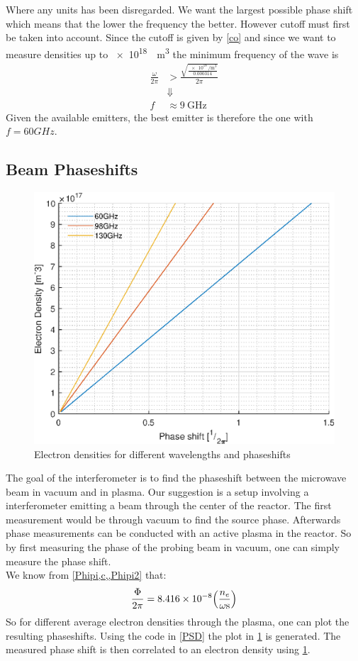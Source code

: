 Where any units has been disregarded. We want the largest possible phase shift which means that the lower the frequency the better. However cutoff must first be taken into account.
Since the cutoff is given by \cref{co} and since we want to measure densities up to \SI{e18}{\per\meter\cubed} the minimum frequency of the wave is
\begin{align}
	\frac{\omega}{2\pi} & > \frac{\sqrt{\frac{\SI{e18}{\per\meter\cubed}}{0.000314}}}{2\pi} \\
	                    & \Downarrow\nonumber                                               \\
	f                   & \approx \SI{9}{\giga\hertz}
\end{align}
Given the available emitters, the best emitter is therefore the one with \(f=60\si{GHz}\).
\subsection{Beam Phaseshifts}
\begin{figure}
	\includegraphics[width=.5\textwidth]{MatlabFigures/PhaseShift/PhaseShift.eps}
	\caption{Electron densities for different wavelengths and phaseshifts}
	\label{PhPlot}
\end{figure}
The goal of the interferometer is to find the phaseshift between the microwave beam in vacuum and in plasma. Our suggestion is a setup involving a interferometer emitting a beam through the center of the reactor. The first measurement would be through vacuum to find the source phase. Afterwards phase measurements can be conducted with an active plasma in the reactor.
So by first measuring the phase of the probing beam in vacuum, one can simply measure the phase shift.\\
We know from \cref{Phipi,c,,Phipi2} that:
\begin{align}
	\frac{\Phi}{2\pi} = 8.416\times 10^{-8}\pqty{\frac{n_e}{\omega\si{\second}}}
\end{align}
So for different average electron densities through the plasma, one can plot the resulting phaseshifts.
Using the code in \cref{PSD} the plot in \cref{PhPlot} is generated. The measured phase shift is then correlated to an electron density using \cref{PhPlot}.

